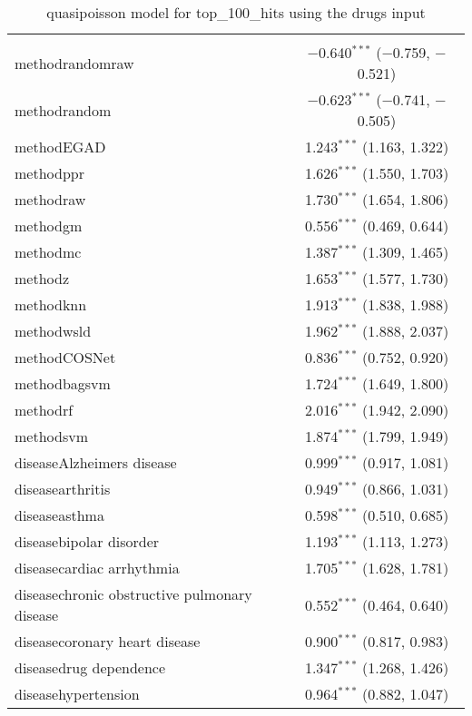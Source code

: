 
\begin{table}[!htbp] \centering 
  \caption{quasipoisson model for top_100_hits using the drugs input} 
  \label{} 
\begin{tabular}{@{\extracolsep{5pt}}lc} 
\\[-1.8ex]\hline 
\hline \\[-1.8ex] 
 methodrandomraw & $-$0.640$^{***}$ ($-$0.759, $-$0.521) \\ 
  methodrandom & $-$0.623$^{***}$ ($-$0.741, $-$0.505) \\ 
  methodEGAD & 1.243$^{***}$ (1.163, 1.322) \\ 
  methodppr & 1.626$^{***}$ (1.550, 1.703) \\ 
  methodraw & 1.730$^{***}$ (1.654, 1.806) \\ 
  methodgm & 0.556$^{***}$ (0.469, 0.644) \\ 
  methodmc & 1.387$^{***}$ (1.309, 1.465) \\ 
  methodz & 1.653$^{***}$ (1.577, 1.730) \\ 
  methodknn & 1.913$^{***}$ (1.838, 1.988) \\ 
  methodwsld & 1.962$^{***}$ (1.888, 2.037) \\ 
  methodCOSNet & 0.836$^{***}$ (0.752, 0.920) \\ 
  methodbagsvm & 1.724$^{***}$ (1.649, 1.800) \\ 
  methodrf & 2.016$^{***}$ (1.942, 2.090) \\ 
  methodsvm & 1.874$^{***}$ (1.799, 1.949) \\ 
  diseaseAlzheimers disease & 0.999$^{***}$ (0.917, 1.081) \\ 
  diseasearthritis & 0.949$^{***}$ (0.866, 1.031) \\ 
  diseaseasthma & 0.598$^{***}$ (0.510, 0.685) \\ 
  diseasebipolar disorder & 1.193$^{***}$ (1.113, 1.273) \\ 
  diseasecardiac arrhythmia & 1.705$^{***}$ (1.628, 1.781) \\ 
  diseasechronic obstructive pulmonary disease & 0.552$^{***}$ (0.464, 0.640) \\ 
  diseasecoronary heart disease & 0.900$^{***}$ (0.817, 0.983) \\ 
  diseasedrug dependence & 1.347$^{***}$ (1.268, 1.426) \\ 
  diseasehypertension & 0.964$^{***}$ (0.882, 1.047) \\ 

\end{tabular}
\end{table}
